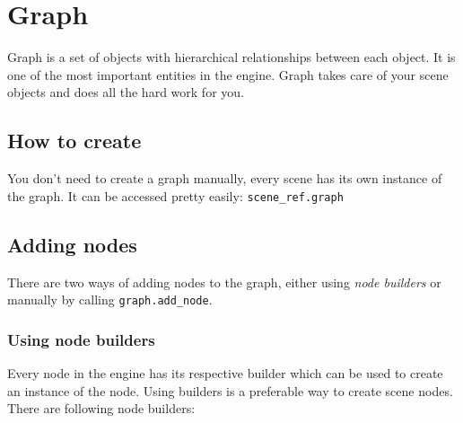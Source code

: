 \documentclass[
]{book}
\theoremstyle{definition}
\theoremstyle{definition}
\theoremstyle{definition}
\theoremstyle{definition}
\theoremstyle{remark}
\begin{document}
\section{Graph}\label{graph}

Graph is a set of objects with hierarchical relationships between each object. It is one of the most important entities in the engine. Graph takes care of your scene objects and does all the hard work for you.

\subsection{How to create}\label{how-to-create-1}

You don't need to create a graph manually, every scene has its own instance of the graph. It can be accessed pretty easily: \texttt{scene\_ref.graph}

\subsection{Adding nodes}\label{adding-nodes}

There are two ways of adding nodes to the graph, either using \emph{node builders} or manually by calling \texttt{graph.add\_node}.

\subsubsection{Using node builders}\label{using-node-builders}

Every node in the engine has its respective builder which can be used to create an instance of the node. Using builders is a preferable way to create scene nodes. There are following node builders:
\end{document}
